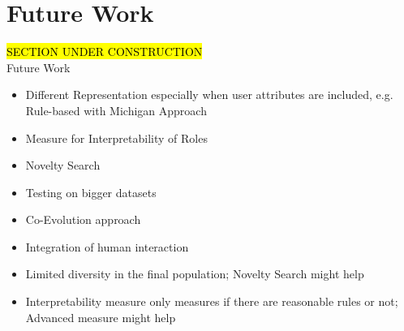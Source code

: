 \newpage
\chapter{Future Work}
\label{sec:futureWork}
\hl{SECTION UNDER CONSTRUCTION}\\
Future Work
\begin{itemize}
\item Different Representation especially when user attributes are included, e.g. Rule-based with Michigan Approach
\item Measure for Interpretability of Roles
\item Novelty Search
\item Testing on bigger datasets
\item Co-Evolution approach
\item Integration of human interaction
\end{itemize}

\begin{itemize}
	\item Limited diversity in the final population; Novelty Search might help
	\item Interpretability measure only measures if there are reasonable rules or not; Advanced measure might help
\end{itemize}
    